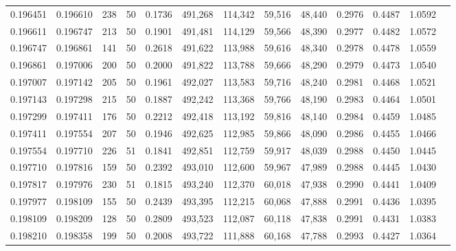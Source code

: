 \begin{tabular}{rrrrrrrrrrrrr}
0.196451 & 0.196610 &   238 &  50 &                                     0.1736 & 491,268 & 114,342 &  59,516 &  48,440 & 0.2976 & 0.4487 & 1.0592 \\
0.196611 & 0.196747 &   213 &  50 &                                     0.1901 & 491,481 & 114,129 &  59,566 &  48,390 & 0.2977 & 0.4482 & 1.0572 \\
0.196747 & 0.196861 &   141 &  50 &                                     0.2618 & 491,622 & 113,988 &  59,616 &  48,340 & 0.2978 & 0.4478 & 1.0559 \\
0.196861 & 0.197006 &   200 &  50 &                                     0.2000 & 491,822 & 113,788 &  59,666 &  48,290 & 0.2979 & 0.4473 & 1.0540 \\
0.197007 & 0.197142 &   205 &  50 &                                     0.1961 & 492,027 & 113,583 &  59,716 &  48,240 & 0.2981 & 0.4468 & 1.0521 \\
0.197143 & 0.197298 &   215 &  50 &                                     0.1887 & 492,242 & 113,368 &  59,766 &  48,190 & 0.2983 & 0.4464 & 1.0501 \\
0.197299 & 0.197411 &   176 &  50 &                                     0.2212 & 492,418 & 113,192 &  59,816 &  48,140 & 0.2984 & 0.4459 & 1.0485 \\
0.197411 & 0.197554 &   207 &  50 &                                     0.1946 & 492,625 & 112,985 &  59,866 &  48,090 & 0.2986 & 0.4455 & 1.0466 \\
0.197554 & 0.197710 &   226 &  51 &                                     0.1841 & 492,851 & 112,759 &  59,917 &  48,039 & 0.2988 & 0.4450 & 1.0445 \\
0.197710 & 0.197816 &   159 &  50 &                                     0.2392 & 493,010 & 112,600 &  59,967 &  47,989 & 0.2988 & 0.4445 & 1.0430 \\
0.197817 & 0.197976 &   230 &  51 &                                     0.1815 & 493,240 & 112,370 &  60,018 &  47,938 & 0.2990 & 0.4441 & 1.0409 \\
0.197977 & 0.198109 &   155 &  50 &                                     0.2439 & 493,395 & 112,215 &  60,068 &  47,888 & 0.2991 & 0.4436 & 1.0395 \\
0.198109 & 0.198209 &   128 &  50 &                                     0.2809 & 493,523 & 112,087 &  60,118 &  47,838 & 0.2991 & 0.4431 & 1.0383 \\
0.198210 & 0.198358 &   199 &  50 &                                     0.2008 & 493,722 & 111,888 &  60,168 &  47,788 & 0.2993 & 0.4427 & 1.0364 \\

\end{tabular}
